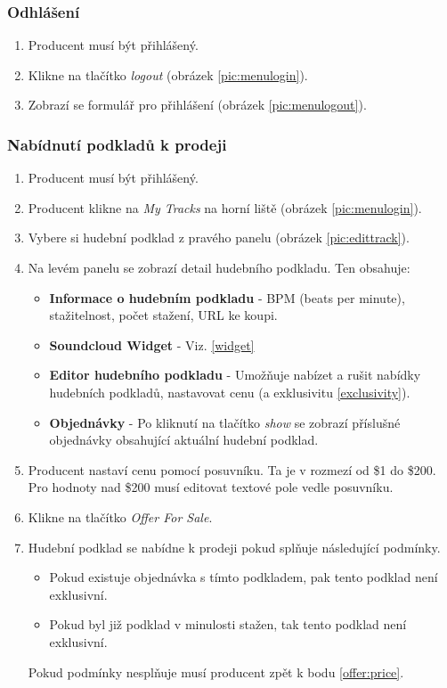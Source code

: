 \documentclass[12pt]{article}
\begin{document}
\subsubsection{Odhlášení}

\begin{enumerate}
\item Producent musí být přihlášený.
\item Klikne na tlačítko \emph{logout} (obrázek \ref{pic:menulogin}).
\item Zobrazí se formulář pro přihlášení (obrázek \ref{pic:menulogout}).
\end{enumerate}

\subsubsection{Nabídnutí podkladů k prodeji}
\begin{enumerate}
\item Producent musí být přihlášený.
\item Producent klikne na \emph{My Tracks} na horní liště (obrázek \ref{pic:menulogin}).
\item Vybere si hudební podklad z pravého panelu (obrázek \ref{pic:edittrack}).

\item Na levém panelu se zobrazí detail hudebního podkladu. Ten obsahuje:

  \begin{itemize}
  \item{\textbf{Informace o hudebním podkladu}} - BPM (beats per minute), stažitelnost, počet stažení, URL ke koupi.
  \item{\textbf{Soundcloud Widget}} - Viz. \ref{widget}
  \item{\textbf{Editor hudebního podkladu}} - Umožňuje nabízet a rušit nabídky hudebních podkladů, nastavovat cenu (a exklusivitu \ref{exclusivity}).
  \item{\textbf{Objednávky}} - Po kliknutí na tlačítko \emph{show} se zobrazí příslušné objednávky obsahující aktuální hudební podklad.
  \end{itemize}

\item \label{offer:price} Producent nastaví cenu pomocí posuvníku. Ta je v rozmezí od \$1 do \$200. Pro hodnoty nad \$200 musí editovat textové pole vedle posuvníku.
\item Klikne na tlačítko \emph{Offer For Sale}.
\item Hudební podklad se nabídne k prodeji pokud splňuje následující podmínky.

  \begin{itemize}
  \item Pokud existuje objednávka s tímto podkladem, pak tento podklad není exklusivní.
  \item Pokud byl již podklad v minulosti stažen, tak tento podklad není exklusivní.
  \end{itemize}

  Pokud podmínky nesplňuje musí producent zpět k bodu \ref{offer:price}.

\end{enumerate}
\end{document}
